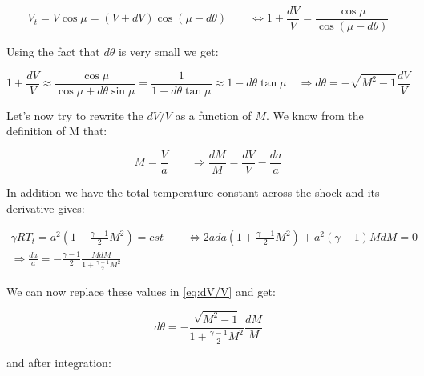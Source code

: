 	\begin{equation}
	V_t = V\cos \mu = (V+dV) \cos (\mu - d\theta) \qquad \Leftrightarrow 1+\frac{dV}{V} = \frac{\cos \mu }{\cos (\mu - d\theta)}
	\label{eq:8.63}
	\end{equation}
	
	Using the fact that $d\theta$ is very small we get: 
	
	\begin{equation}
	1+\frac{dV}{V} \approx \frac{\cos \mu }{\cos \mu + d\theta \sin \mu } = \frac{1}{1 + d\theta \tan \mu} \approx 1- d\theta \tan \mu \quad \Rightarrow d\theta = - \sqrt{M^2 - 1} \frac{dV}{V} 
	\label{eq:dV/V}
	\end{equation}
	
	Let's now try to rewrite the $dV/V$ as a function of $M$. We know from the definition of M that: 
	
	\begin{equation}
	M = \frac{V}{a} \qquad \Rightarrow \frac{dM}{M} = \frac{dV}{V} - \frac{da}{a}
	\end{equation}
	
	In addition we have the total temperature constant across the shock and its derivative gives: 
	
	\begin{equation}
	\begin{array}{c}
	\gamma R T_t = a^2 \left( 1+ \frac{\gamma -1}{2} M^2\right) = cst \qquad \Leftrightarrow 2ada \left( 1+ \frac{\gamma -1}{2} M^2\right)+ a^2 (\gamma -1) M dM = 0  \\
	\Rightarrow \frac{da}{a} = - \frac{\gamma-1}{2}\frac{MdM}{1+ \frac{\gamma -1}{2} M^2}
	\end{array}
	\end{equation}
	
	We can now replace these values in \eqref{eq:dV/V} and get: 
	
	\begin{equation}
	d\theta = -\frac{\sqrt{M^2 -1}}{1+\frac{\gamma -1}{2} M^2}\frac{dM}{M}
	\end{equation}
	
	and after integration: 
	
	\begin{center}
	\end{center}
	
